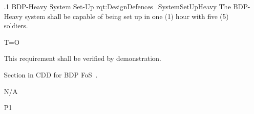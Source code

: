 \ONERQMTVKSA
{\RqtNumberBase.1}
{BDP-Heavy System Set-Up}
{rqt:DesignDefences_SystemSetUpHeavy}
{The BDP-Heavy system shall be capable of being set up in one (1) hour with five (5) soldiers.}
{
	\item [Phase 1] T=O
}
{This requirement shall be verified by demonstration.}
{
\item [5.5.16.1] Section in CDD for BDP FoS~\cite{ref__BDP_FOS_CDD}.
}
{
	\item N/A
}
{P1}
